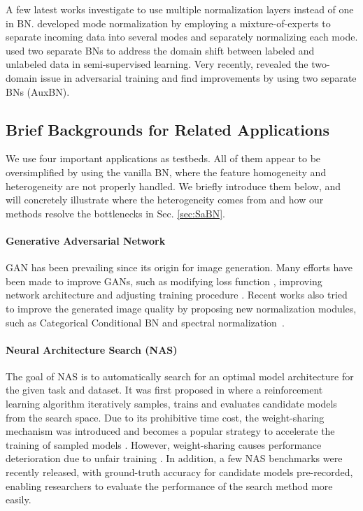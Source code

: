 \documentclass{article}
\begin{document}
A few latest works investigate to use multiple normalization layers instead of one in BN. \citep{deecke2018mode} developed mode normalization by employing a mixture-of-experts to separate incoming data into several modes and separately normalizing each mode. \citep{zajkac2019split} used two separate BNs to address the domain shift between labeled and unlabeled data in semi-supervised learning. Very recently, \citep{xie2019intriguing,xie2019adversarial} revealed the two-domain issue in adversarial training and find improvements by using two separate BNs (AuxBN).

\subsection{Brief Backgrounds for Related Applications}
We use four important applications as testbeds. All of them appear to be oversimplified by using the vanilla BN, where the feature homogeneity and heterogeneity are not properly handled. We briefly introduce them below, and will concretely illustrate where the heterogeneity comes from and how our methods resolve the bottlenecks in Sec. \ref{sec:SaBN}.
\paragraph{Generative Adversarial Network}
GAN has been prevailing since its origin \citep{goodfellow2014generative} for image generation. Many efforts have been made to improve GANs, such as modifying loss function \citep{arjovsky2017wasserstein, gulrajani2017improved,jolicoeur2018relativistic}, improving network architecture \citep{zhang2018self,karras2019style,gong2019autogan} and adjusting training procedure \citep{karras2017progressive}. Recent works also tried to improve the generated image quality by proposing new normalization modules, such as Categorical Conditional BN and spectral normalization~\citep{miyato2018spectral}. 

\paragraph{Neural Architecture Search (NAS)} The goal of NAS is to automatically search for an optimal model architecture for the given task and dataset.  It was first proposed in \citep{zoph2016neural} where a reinforcement learning algorithm iteratively samples, trains and evaluates candidate models from the search space. Due to its prohibitive time cost, the weight-sharing mechanism was introduced \citep{pham2018efficient} and becomes a popular strategy to accelerate the training of sampled models \citep{liu2018darts}. However, weight-sharing causes performance deterioration due to unfair training \citep{chu2019fairnas}. In addition, a few NAS benchmarks \citep{ying2019bench,dong2020bench,zela2020bench} were recently released, with ground-truth accuracy for candidate models pre-recorded, enabling researchers to evaluate the performance of the search method more easily.
\end{document}
